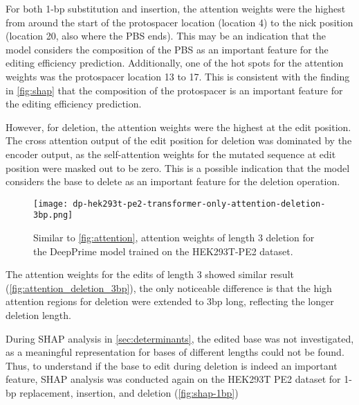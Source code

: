 For both 1-bp substitution and insertion, the attention weights were the highest from around the start of the protospacer location (location 4) to the nick position (location 20, also where the PBS ends). This may be an indication that the model considers the composition of the PBS as an important feature for the editing efficiency prediction. Additionally, one of the hot spots for the attention weights was the protospacer location 13 to 17. This is consistent with the finding in \autoref{fig:shap} that the composition of the protospacer is an important feature for the editing efficiency prediction.

However, for deletion, the attention weights were the highest at the edit position. The cross attention output of the edit position for deletion was dominated by the encoder output, as the self-attention weights for the mutated sequence at edit position were masked out to be zero. This is a possible indication that the model considers the base to delete as an important feature for the deletion operation.

\begin{figure}
    \centering
    \texttt{[image: dp-hek293t-pe2-transformer-only-attention-deletion-3bp.png]}
    \caption[Attention weights for 3-bp deletion of the DeepPrime model trained on the HEK293T-PE2 dataset]{Similar to \autoref{fig:attention}, attention weights of length 3 deletion for the DeepPrime model trained on the HEK293T-PE2 dataset.}
    \label{fig:attention_deletion_3bp}
\end{figure}

The attention weights for the edits of length 3 showed similar result (\autoref{fig:attention_deletion_3bp}), the only noticeable difference is that the high attention regions for deletion were extended to 3bp long, reflecting the longer deletion length.

During SHAP analysis in \autoref{sec:determinants}, the edited base was not investigated, as a meaningful representation for bases of different lengths could not be found. Thus, to understand if the base to edit during deletion is indeed an important feature, SHAP analysis was conducted again on the HEK293T PE2 dataset for 1-bp replacement, insertion, and deletion (\autoref{fig:shap-1bp})

